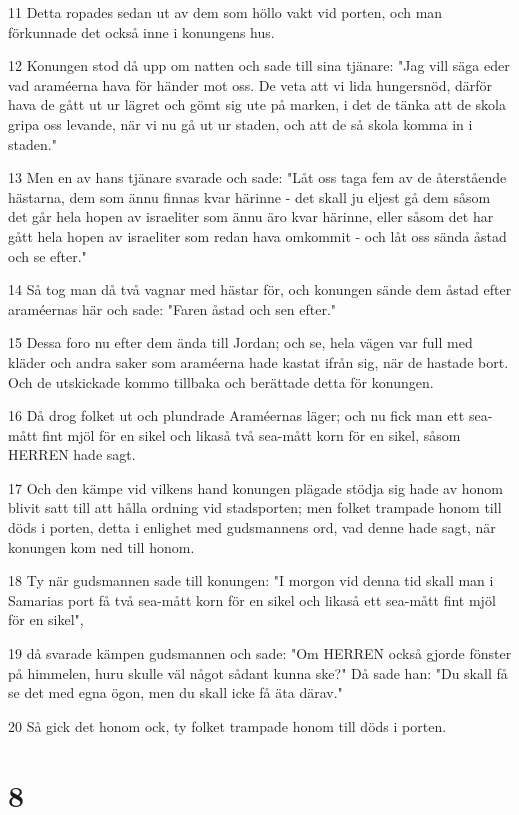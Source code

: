 \par 11 Detta ropades sedan ut av dem som höllo vakt vid porten, och man förkunnade det också inne i konungens hus.
\par 12 Konungen stod då upp om natten och sade till sina tjänare: "Jag vill säga eder vad araméerna hava för händer mot oss. De veta att vi lida hungersnöd, därför hava de gått ut ur lägret och gömt sig ute på marken, i det de tänka att de skola gripa oss levande, när vi nu gå ut ur staden, och att de så skola komma in i staden."
\par 13 Men en av hans tjänare svarade och sade: "Låt oss taga fem av de återstående hästarna, dem som ännu finnas kvar härinne - det skall ju eljest gå dem såsom det går hela hopen av israeliter som ännu äro kvar härinne, eller såsom det har gått hela hopen av israeliter som redan hava omkommit - och låt oss sända åstad och se efter."
\par 14 Så tog man då två vagnar med hästar för, och konungen sände dem åstad efter araméernas här och sade: "Faren åstad och sen efter."
\par 15 Dessa foro nu efter dem ända till Jordan; och se, hela vägen var full med kläder och andra saker som araméerna hade kastat ifrån sig, när de hastade bort. Och de utskickade kommo tillbaka och berättade detta för konungen.
\par 16 Då drog folket ut och plundrade Araméernas läger; och nu fick man ett sea-mått fint mjöl för en sikel och likaså två sea-mått korn för en sikel, såsom HERREN hade sagt.
\par 17 Och den kämpe vid vilkens hand konungen plägade stödja sig hade av honom blivit satt till att hålla ordning vid stadsporten; men folket trampade honom till döds i porten, detta i enlighet med gudsmannens ord, vad denne hade sagt, när konungen kom ned till honom.
\par 18 Ty när gudsmannen sade till konungen: "I morgon vid denna tid skall man i Samarias port få två sea-mått korn för en sikel och likaså ett sea-mått fint mjöl för en sikel",
\par 19 då svarade kämpen gudsmannen och sade: "Om HERREN också gjorde fönster på himmelen, huru skulle väl något sådant kunna ske?" Då sade han: "Du skall få se det med egna ögon, men du skall icke få äta därav."
\par 20 Så gick det honom ock, ty folket trampade honom till döds i porten.

\chapter{8}

